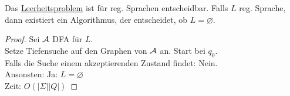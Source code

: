 \begin{Satz}[name={[Leerheitsproblem]}]\label{satz:leerheitsproblem}
	Das \underline{Leerheitsproblem} ist für reg. Sprachen entscheidbar.
	Falls $L$ reg. Sprache, dann existiert ein Algorithmus, der entscheidet, ob $L=\varnothing$.
\end{Satz}
\begin{proof}
	Sei $\mathcal{A}$ \ac{DFA} für $L$.\\
	Setze Tiefensuche auf den Graphen von $\mathcal{A}$ an. Start bei $q_0$.\\
	Falls die Suche einem akzeptierenden Zustand findet: Nein.\\
	Ansonsten: Ja: $L=\varnothing$\\
	Zeit: $O(|\Sigma||Q|)$
\end{proof}


